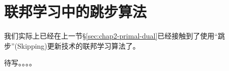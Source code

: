 \section{联邦学习中的跳步算法}
\label{sec:chap2-skip-alg}


我们实际上已经在上一节\S\ref{sec:chap2-primal-dual}已经接触到了使用``跳步''(Skipping)更新技术的联邦学习算法了。

待写。。。。
